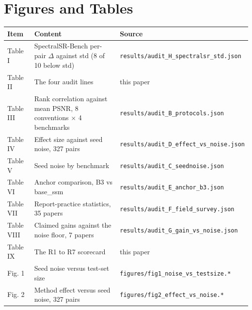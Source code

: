\documentclass[journal,twoside,10pt]{IEEEtran}
\newlength{\tblavail}
\begin{document}
\section*{Figures and Tables}
\begin{center}\small
\setlength{\tabcolsep}{3pt}
\setlength{\tblavail}{\dimexpr\columnwidth-6\tabcolsep\relax}
\begin{tabular}{@{}l p{0.42\tblavail} p{0.32\tblavail}@{}}
\hline
Item & Content & Source \\
\hline
Table I & SpectralSR-Bench per-pair $\Delta$ against std (8 of 10 below std) & \texttt{results/\allowbreak audit\_\allowbreak H\_\allowbreak spectralsr\_\allowbreak std.json} \\
Table II & The four audit lines & this paper \\
Table III & Rank correlation against mean PSNR, 8 conventions $\times$ 4 benchmarks & \texttt{results/\allowbreak audit\_\allowbreak B\_\allowbreak protocols.json} \\
Table IV & Effect size against seed noise, 327 pairs & \texttt{results/\allowbreak audit\_\allowbreak D\_\allowbreak effect\_\allowbreak vs\_\allowbreak noise.json} \\
Table V & Seed noise by benchmark & \texttt{results/\allowbreak audit\_\allowbreak C\_\allowbreak seednoise.json} \\
Table VI & Anchor comparison, B3 vs base\_ssm & \texttt{results/\allowbreak audit\_\allowbreak E\_\allowbreak anchor\_\allowbreak b3.json} \\
Table VII & Report-practice statistics, 35 papers & \texttt{results/\allowbreak audit\_\allowbreak F\_\allowbreak field\_\allowbreak survey.json} \\
Table VIII & Claimed gains against the noise floor, 7 papers & \texttt{results/\allowbreak audit\_\allowbreak G\_\allowbreak gain\_\allowbreak vs\_\allowbreak noise.json} \\
Table IX & The R1 to R7 scorecard & this paper \\
Fig. 1 & Seed noise versus test-set size & \texttt{figures/\allowbreak fig1\_\allowbreak noise\_\allowbreak vs\_\allowbreak testsize.*} \\
Fig. 2 & Method effect versus seed noise, 327 pairs & \texttt{figures/\allowbreak fig2\_\allowbreak effect\_\allowbreak vs\_\allowbreak noise.*} \\
\hline
\end{tabular}
\end{center}
\end{document}
